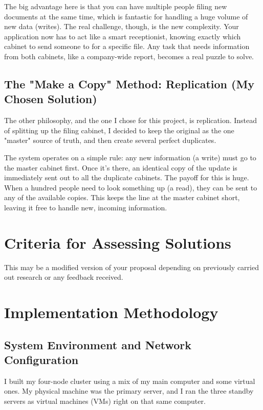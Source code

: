 \documentclass[conference]{IEEEtran}
\begin{document}
The big advantage here is that you can have multiple people filing new documents at the same time, which is fantastic for handling a huge volume of new data (writes). The real challenge, though, is the new complexity. Your application now has to act like a smart receptionist, knowing exactly which cabinet to send someone to for a specific file. Any task that needs information from both cabinets, like a company-wide report, becomes a real puzzle to solve.

\subsection{The "Make a Copy" Method: Replication (My Chosen Solution)}
The other philosophy, and the one I chose for this project, is replication. Instead of splitting up the filing cabinet, I decided to keep the original as the one "master" source of truth, and then create several perfect duplicates.

The system operates on a simple rule: any new information (a write) must go to the master cabinet first. Once it's there, an identical copy of the update is immediately sent out to all the duplicate cabinets. The payoff for this is huge. When a hundred people need to look something up (a read), they can be sent to any of the available copies. This keeps the line at the master cabinet short, leaving it free to handle new, incoming information.

\section{Criteria for Assessing Solutions} \label{sec:criteria}
This may be a modified version of your proposal depending on previously carried out research or any feedback received.  



\section{Implementation Methodology}

\subsection{System Environment and Network Configuration}
I built my four-node cluster using a mix of my main computer and some virtual ones. My physical machine was the primary server, and I ran the three standby servers as virtual machines (VMs) right on that same computer.
\end{document}
